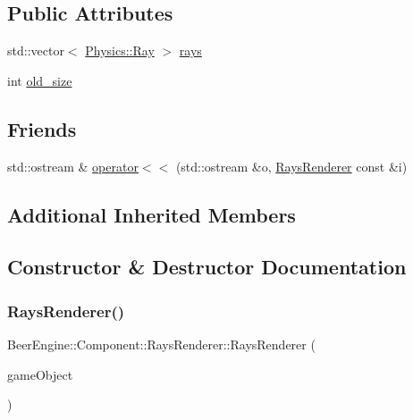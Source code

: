 \subsection*{Public Attributes}
\begin{DoxyCompactItemize}
\item 
std\+::vector$<$ \mbox{\hyperlink{struct_beer_engine_1_1_physics_1_1_ray}{Physics\+::\+Ray}} $>$ \mbox{\hyperlink{class_beer_engine_1_1_component_1_1_rays_renderer_a3f80ea11d34b53d1ddddeb0a91f96e30}{rays}}
\item 
int \mbox{\hyperlink{class_beer_engine_1_1_component_1_1_rays_renderer_a3ae64b7d39b2a52add74450a65343d31}{old\+\_\+size}}
\end{DoxyCompactItemize}
\subsection*{Friends}
\begin{DoxyCompactItemize}
\item 
std\+::ostream \& \mbox{\hyperlink{class_beer_engine_1_1_component_1_1_rays_renderer_a836618cc9ceb165dceabafb52cbf742f}{operator$<$$<$}} (std\+::ostream \&o, \mbox{\hyperlink{class_beer_engine_1_1_component_1_1_rays_renderer}{Rays\+Renderer}} const \&i)
\end{DoxyCompactItemize}
\subsection*{Additional Inherited Members}


\subsection{Constructor \& Destructor Documentation}
\mbox{\label{class_beer_engine_1_1_component_1_1_rays_renderer_a0d3637f17a8c0c6e159a52a196834bb6}} 
\subsubsection{\texorpdfstring{Rays\+Renderer()}{RaysRenderer()}}
{\footnotesize\ttfamily Beer\+Engine\+::\+Component\+::\+Rays\+Renderer\+::\+Rays\+Renderer (\begin{DoxyParamCaption}\item[{\mbox{\hyperlink{class_beer_engine_1_1_game_object}{Beer\+Engine\+::\+Game\+Object}} $\ast$}]{game\+Object }\end{DoxyParamCaption})}

